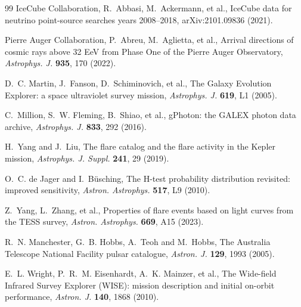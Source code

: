\documentclass[3p,11pt]{elsarticle}
\begin{document}
\begin{thebibliography}{99}
IceCube Collaboration, R.~Abbasi, M.~Ackermann, et al., IceCube data for neutrino
point-source searches years 2008--2018, arXiv:2101.09836 (2021).

Pierre Auger Collaboration, P.~Abreu, M.~Aglietta, et al., Arrival directions of cosmic
rays above 32 EeV from Phase One of the Pierre Auger Observatory, \emph{Astrophys. J.}
\textbf{935}, 170 (2022).

D.~C. Martin, J.~Fanson, D.~Schiminovich, et al., The Galaxy Evolution Explorer: a space
ultraviolet survey mission, \emph{Astrophys. J.} \textbf{619}, L1 (2005).

C.~Million, S.~W. Fleming, B.~Shiao, et al., gPhoton: the GALEX photon data archive,
\emph{Astrophys. J.} \textbf{833}, 292 (2016).

H.~Yang and J.~Liu, The flare catalog and the flare activity in the Kepler mission,
\emph{Astrophys. J. Suppl.} \textbf{241}, 29 (2019).

O.~C. de Jager and I.~B\"usching, The H-test probability distribution revisited: improved
sensitivity, \emph{Astron. Astrophys.} \textbf{517}, L9 (2010).

Z.~Yang, L.~Zhang, et al., Properties of flare events based on light curves from the TESS
survey, \emph{Astron. Astrophys.} \textbf{669}, A15 (2023).

R.~N. Manchester, G.~B. Hobbs, A.~Teoh and M.~Hobbs, The Australia Telescope National
Facility pulsar catalogue, \emph{Astron. J.} \textbf{129}, 1993 (2005).

E.~L. Wright, P.~R.~M. Eisenhardt, A.~K. Mainzer, et al., The Wide-field Infrared Survey
Explorer (WISE): mission description and initial on-orbit performance, \emph{Astron. J.}
\textbf{140}, 1868 (2010).

\end{thebibliography}
\end{document}
